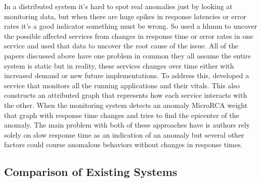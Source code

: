 In a distributed system it's hard to spot real anomalies just by looking at monitoring data, but when there are huge spikes in response latencies or error rates it's a good indicator something must be wrong. So \cite{samir2019dla} used a \ac{hhmm} to uncover the possible affected services from changes in response time or error rates in one service and used that data to uncover the root cause of the issue. All of the papers discussed above have one problem in common they all assume the entire system is static but in reality, these services changes over time either with increased demand or new future implementations. To address this, \cite{wu2020microrca} developed a service that monitors all the running applications and their vitals. This also constructs an attributed graph that represents how each service interacts with the other. When the monitoring system detects an anomaly MicroRCA weight that graph with response time changes and tries to find the epicenter of the anomaly. The main problem with both of these approaches have is authors rely solely on slow response time as an indication of an anomaly but several other factors could course anomalous behaviors without changes in response times.

\subsection{Comparison of Existing Systems}

